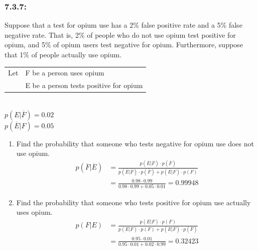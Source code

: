 \documentclass[a4paper]{article}
\begin{document}
\subsubsection*{7.3.7:}
Suppose that a test for opium use has a 2\% false positive rate and a 5\% false negative rate. That is, 2\% of people who do not use opium test positive for opium, and 5\% of opium users test negative for opium. Furthermore, suppose that 1\% of people actually use opium. \\
\begin{tabular}{r l}
	Let & F be a person uses opium               \\
	    & E be a person tests positive for opium
\end{tabular} \\
$p(E|\overline{F}) = 0.02$ \\
$p(\overline{E}|F) = 0.05$
\begin{enumerate}[label=\alph*)]
	\item Find the probability that someone who tests negative for opium use does not use opium.
	      \begin{align*}
		      p(\overline{F}|\overline{E}) & = \frac{p(\overline{E}|\overline{F})\cdot p(\overline{F})}{p(\overline{E}|\overline{F})\cdot p(\overline{F}) + p(\overline{E}|F)\cdot p(F)} \\
		                                   & = \frac{0.98 \cdot 0.99}{0.98\cdot0.99+0.05\cdot0.01} = 0.99948
	      \end{align*}
	\item Find the probability that someone who tests positive for opium use actually uses opium.
	      \begin{align*}
		      p(F|E) & = \frac{p(E|F)\cdot p(F)}{p(E|F)\cdot p(F) + p(E|\overline{F})\cdot p(\overline{F})} \\
		             & = \frac{0.95\cdot0.01}{0.95\cdot0.01+0.02\cdot0.99} = 0.32423
	      \end{align*}
\end{enumerate}

\end{document}
